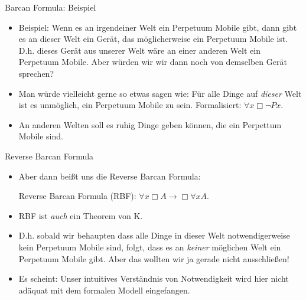 \documentclass[12pt]{beamer}
\begin{document}
\begin{frame}{Barcan Formula: Beispiel}
  \begin{itemize}[<+->]
  \item Beispiel: Wenn es an irgendeiner Welt ein Perpetuum Mobile
    gibt, dann gibt es an dieser Welt ein Gerät, das möglicherweise
    ein Perpetuum Mobile ist. D.h. dieses Gerät aus unserer Welt wäre
    an einer anderen Welt ein Perpetuum Mobile. Aber würden wir wir
    dann noch von demselben Gerät sprechen?
  \item Man würde vielleicht gerne so etwas sagen wie: Für alle Dinge
    auf \emph{dieser} Welt ist es unmöglich, ein Perpetuum Mobile zu
    sein. Formalisiert: $\forall x \Box \neg Px$.
  \item An anderen Welten soll es ruhig Dinge geben können, die ein
    Perpettum Mobile sind.
  \end{itemize}
\end{frame}

\begin{frame}{Reverse Barcan Formula}
  \begin{itemize}[<+->]
  \item Aber dann beißt uns die Reverse Barcan Formula:
    \begin{center}
      Reverse Barcan Formula (RBF):
      $\forall x \Box A \to \Box \forall x A$.
    \end{center}
  \item RBF ist \emph{auch} ein Theorem von K.
  \item D.h. sobald wir behaupten dass alle Dinge in dieser Welt
    notwendigerweise kein Perpetuum Mobile sind, folgt, dass es an
    \emph{keiner} möglichen Welt ein Perpetuum Mobile gibt. Aber das
    wollten wir ja gerade nicht ausschließen!
  \item Es scheint: Unser intuitives Verständnis von Notwendigkeit
    wird hier nicht adäquat mit dem formalen Modell eingefangen.
  \end{itemize}
\end{frame}
\end{document}
